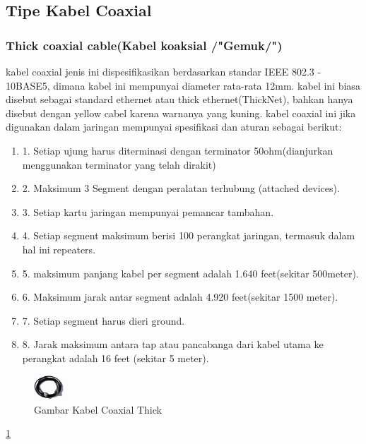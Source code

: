 	\subsection{Tipe Kabel Coaxial}
		\subsubsection{Thick coaxial cable(Kabel koaksial /"Gemuk/")}
		kabel coaxial jenis ini dispesifikasikan berdasarkan standar IEEE 802.3 - 10BASE5, dimana kabel ini mempunyai diameter rata-rata 12mm. kabel ini biasa disebut sebagai standard ethernet atau thick ethernet(ThickNet), bahkan hanya disebut dengan yellow cabel karena warnanya yang kuning.
		kabel coaxial ini jika digunakan dalam jaringan mempunyai spesifikasi dan aturan sebagai berikut:
			\begin{enumerate}
				\item 1. Setiap ujung harus diterminasi dengan terminator 50ohm(dianjurkan menggunakan terminator yang telah dirakit)
				\item 2. Maksimum 3 Segment dengan peralatan terhubung (attached devices).
				\item 3. Setiap kartu jaringan mempunyai pemancar tambahan.
				\item 4. Setiap segment maksimum berisi 100 perangkat jaringan, termasuk dalam hal ini repeaters.
				\item 5. maksimum panjang kabel per segment adalah 1.640 feet(sekitar 500meter).
				\item 6. Maksimum jarak antar segment adalah 4.920 feet(sekitar 1500 meter).
				\item 7. Setiap segment harus dieri ground.
				\item 8. Jarak maksimum antara tap atau pancabanga dari kabel utama ke perangkat adalah 16 feet (sekitar 5 meter).
			\end{enumerate}
\begin{figure} [ht]
	\centerline{\includegraphics[width=0.1\textwidth]{figures/thickcoax.jpg}}
	\caption{Gambar Kabel Coaxial Thick}
	\label{thickcoax}
\end{figure}
	\ref{thickcoax}
	
